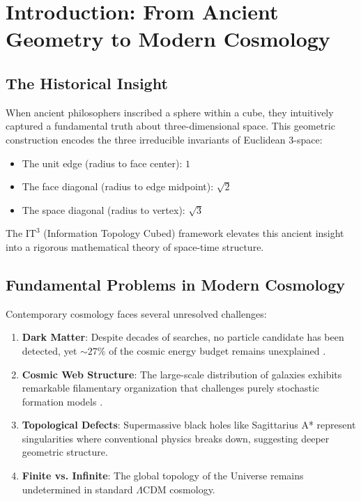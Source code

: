 \documentclass[12pt,a4paper,oneside]{article}
\newcommand{\ITthree}{\text{IT}^3}
\begin{document}
\tableofcontents
\newpage

\section{Introduction: From Ancient Geometry to Modern Cosmology}

\subsection{The Historical Insight}

When ancient philosophers inscribed a sphere within a cube, they intuitively captured a fundamental truth about three-dimensional space. This geometric construction encodes the three irreducible invariants of Euclidean 3-space:
\begin{itemize}
    \item The unit edge (radius to face center): $1$
    \item The face diagonal (radius to edge midpoint): $\sqrt{2}$
    \item The space diagonal (radius to vertex): $\sqrt{3}$
\end{itemize}

The $\ITthree$ (Information Topology Cubed) framework elevates this ancient insight into a rigorous mathematical theory of space-time structure.

\subsection{Fundamental Problems in Modern Cosmology}

Contemporary cosmology faces several unresolved challenges:
\begin{enumerate}
    \item \textbf{Dark Matter}: Despite decades of searches, no particle candidate has been detected, yet $\sim 27\%$ of the cosmic energy budget remains unexplained \cite{Planck2018, Bertone2018}.
    
    \item \textbf{Cosmic Web Structure}: The large-scale distribution of galaxies exhibits remarkable filamentary organization that challenges purely stochastic formation models \cite{Bond1996, Tempel2014}.
    
    \item \textbf{Topological Defects}: Supermassive black holes like Sagittarius A* represent singularities where conventional physics breaks down, suggesting deeper geometric structure.
    
    \item \textbf{Finite vs. Infinite}: The global topology of the Universe remains undetermined in standard $\Lambda$CDM cosmology.
\end{enumerate}
\end{document}
